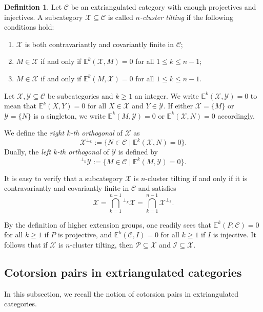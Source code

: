 \documentclass[a4paper,reqno,11pt]{amsart}
\theoremstyle{definition}
\newtheorem{definition}[theorem]{Definition}
\begin{document}
\begin{definition}\cite[Definition 5.3]{LN}
Let $\mathcal{C}$ be an extriangulated category with enough projectives and injectives. A subcategory $\mathcal{X} \subseteq \mathcal{C}$ is called \emph{$n$-cluster tilting} if the following conditions hold:
\begin{enumerate}
\item[{\rm (1)}] $\mathcal{X}$ is both contravariantly and covariantly finite in $\mathcal{C}$;
\item[{\rm (2)}] $M \in \mathcal{X}$ if and only if $\mathbb{E}^k(\mathcal{X}, M) = 0$ for all $1 \leq k \leq n-1$;
\item[{\rm (3)}] $M \in \mathcal{X}$ if and only if $\mathbb{E}^k(M, \mathcal{X}) = 0$ for all $1 \leq k \leq n-1$.
\end{enumerate}
\end{definition}

Let $\mathcal{X}, \mathcal{Y} \subseteq \mathcal{C}$ be subcategories and $k \geq 1$ an integer. We write $\mathbb{E}^k(\mathcal{X}, \mathcal{Y}) = 0$ to mean that $\mathbb{E}^k(X, Y) = 0$ for all $X \in \mathcal{X}$ and $Y \in \mathcal{Y}$. If either $\mathcal{X} = \{M\}$ or $\mathcal{Y} = \{N\}$ is a singleton, we write $\mathbb{E}^k(M, \mathcal{Y}) = 0$ or $\mathbb{E}^k(\mathcal{X}, N) = 0$ accordingly.

We define the \emph{right $k$-th orthogonal} of $\mathcal{X}$ as
\[
\mathcal{X}^{\perp_k} := \{ N \in \mathcal{C} \mid \mathbb{E}^k(\mathcal{X}, N) = 0 \}.
\]
Dually, the \emph{left $k$-th orthogonal} of $\mathcal{Y}$ is defined by
\[
{}^{\perp_k} \mathcal{Y} := \{ M \in \mathcal{C} \mid \mathbb{E}^k(M, \mathcal{Y}) = 0 \}.
\]

It is easy to verify that a subcategory $\mathcal{X}$ is $n$-cluster tilting if and only if it is contravariantly and covariantly finite in $\mathcal{C}$ and satisfies
\[
\mathcal{X} = \bigcap_{k=1}^{n-1} {}^{\perp_k} \mathcal{X} = \bigcap_{k=1}^{n-1} \mathcal{X}^{\perp_k}.
\]

By the definition of higher extension groups, one readily sees that $\mathbb{E}^k(P, \mathcal{C}) = 0$ for all $k \geq 1$ if $P$ is projective, and $\mathbb{E}^k(\mathcal{C}, I) = 0$ for all $k \geq 1$ if $I$ is injective. It follows that if $\mathcal{X}$ is $n$-cluster tilting, then $\mathcal{P} \subseteq \mathcal{X}$ and $\mathcal{I} \subseteq \mathcal{X}$.


\subsection{Cotorsion pairs in extriangulated categories}
In this subsection, we recall the notion of cotorsion pairs in extriangulated categories.
\end{document}
